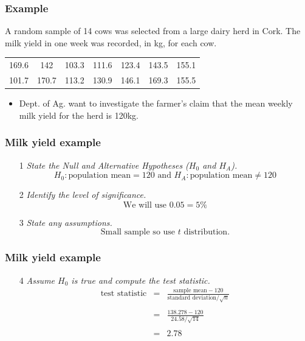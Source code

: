 \documentclass[12pt,xcolor=dvipsnames,handout,mathserif,aspectratio=169]{beamer}
\begin{document}
\begin{frame}\frametitle{Example}
A random sample of 14 cows was selected from a large dairy herd in Cork. The milk yield in one week was recorded, in kg, for each cow. \\
\vspace{0.5cm}
\begin{tabular}{ccccccc}
169.6&142&103.3&111.6&123.4&143.5&155.1\\
101.7&170.7&113.2&130.9&146.1&169.3&155.5
\end{tabular}
\vspace{0.5cm}

\begin{itemize}
\item Dept. of Ag. want to investigate the farmer's claim that the mean weekly milk yield for the herd is 120kg.
\end{itemize}
\end{frame}


\begin{frame}\frametitle{Milk yield example}
\begin{enumerate}
\item[1] \emph{State the Null and Alternative Hypotheses ($H_0$ and $H_A$).}
$$H_{0}: \mbox{population mean} = 120 \mbox{ and } H_{A}: \mbox{population mean} \neq 120$$
\item[2] \emph{Identify the level of significance.}
$$\mbox{We will use } 0.05  = 5\%$$
\item[3] \emph{State any assumptions.}
$$\mbox{Small sample so use $t$ distribution.}$$
\end{enumerate}
\end{frame}

\begin{frame}\frametitle{Milk yield example}
\begin{enumerate}
\item[4] \emph{Assume $H_0$ is true and compute the test statistic. }
\begin{eqnarray*} 
\mbox{test statistic} & = &\frac{\mbox{sample mean} - 120}{\mbox{standard deviation}/\sqrt{n}} \\
 & & \\
 &=& \frac{138.278 - 120}{24.58/\sqrt{14}} \\
  & & \\
 & =& 2.78
\end{eqnarray*}
\end{enumerate}
\end{frame}
\end{document}
